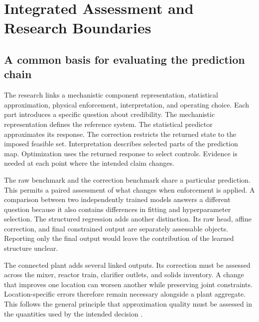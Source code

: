 \chapter{Integrated Assessment and Research Boundaries}
\label{ch:assessment}

\section{A common basis for evaluating the prediction chain}

The research links a mechanistic component representation, statistical approximation, physical enforcement, interpretation, and operating choice. Each part introduces a specific question about credibility. The mechanistic representation defines the reference system. The statistical predictor approximates its response. The correction restricts the returned state to the imposed feasible set. Interpretation describes selected parts of the prediction map. Optimization uses the returned response to select controls. Evidence is needed at each point where the intended claim changes.

The raw benchmark and the correction benchmark share a particular prediction. This permits a paired assessment of what changes when enforcement is applied. A comparison between two independently trained models answers a different question because it also contains differences in fitting and hyperparameter selection. The structured regression adds another distinction. Its raw head, affine correction, and final constrained output are separately assessable objects. Reporting only the final output would leave the contribution of the learned structure unclear.

The connected plant adds several linked outputs. Its correction must be assessed across the mixer, reactor train, clarifier outlets, and solids inventory. A change that improves one location can worsen another while preserving joint constraints. Location-specific errors therefore remain necessary alongside a plant aggregate. This follows the general principle that approximation quality must be assessed in the quantities used by the intended decision \citep{BhosekarIerapetritou2018,McBride2019}.

